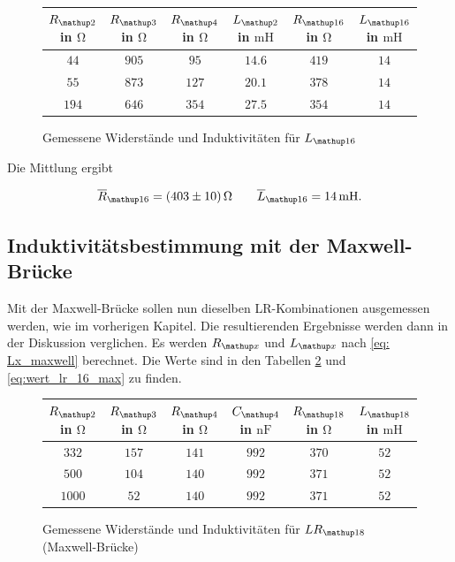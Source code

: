 \begin{figure}
\centering
\caption{Gemessene Widerstände und Induktivitäten für $L\ua{16}$}
  \label{tab:lc_r16}
\begin{tabular}{S S S S S S }
    \toprule
    {$R\ua{2}$  in $\si{\ohm}$} &  {$R\ua{3}$ in $\si{\ohm}$} & {$R\ua{4}$ in $\si{\ohm}$} & {$L\ua{2}$ in $\si{\milli\henry}$}& {$R\ua{16}$ in $\si{\ohm}$} &  {$L\ua{16}$ in $\si{\milli\henry}$} \\
    \midrule
     {$\num{44}$} & {$\num{905}$} &  {$\num{95}$}& {$\num{14,6}$}  &  {$\num{419}$} & {$\num{14}$}\\
     {$\num{55}$} & {$\num{873}$}  & {$\num{127}$} & {$\num{20,1}$} & {$\num{378}$} & {$\num{14}$}\\
     {$\num{194}$} & {$\num{646}$}  & {$\num{354}$} & {$\num{27,5}$} &{$\num{354}$} & {$\num{14}$}  \\
    \bottomrule
  \end{tabular}
 \end{figure}

Die Mittlung ergibt

\begin{equation}
\label{eq:wert_r16_l_16}
\overline{R}_{\map{16}}=\SI{403\pm10}{\ohm} \qquad \overline{L}_{\map{16}}=\SI{14}{\milli\henry}.
\end{equation}

\subsection{Induktivitätsbestimmung mit der Maxwell-Brücke}

Mit der Maxwell-Brücke sollen nun dieselben LR-Kombinationen ausgemessen werden, wie 
im vorherigen Kapitel.
Die resultierenden Ergebnisse werden dann in der Diskussion verglichen.
Es werden $R\ua{x}$ und $L\ua{x}$ nach \eqref{eq: Lx_maxwell} berechnet.
Die Werte sind in den Tabellen \ref{tab:lc_r18_max} und \ref{eq:wert_lr_16_max} zu finden.

\begin{figure}
\centering
\caption{Gemessene Widerstände und Induktivitäten für $LR\ua{18}$ (Maxwell-Brücke)}
  \label{tab:lc_r18_max}
\begin{tabular}{S S S S S S }
    \toprule
    {$R\ua{2}$  in $\si{\ohm}$} &  {$R\ua{3}$ in $\si{\ohm}$} & {$R\ua{4}$ in $\si{\ohm}$} & {$C\ua{4}$ in $\si{\nano\farad}$}& {$R\ua{18}$ in $\si{\ohm}$} &  {$L\ua{18}$ in $\si{\milli\henry}$} \\
    \midrule
     {$\num{332}$} & {$\num{157}$} &  {$\num{141}$}& {$\num{992}$}  &  {$\num{370}$} & {$\num{52}$}\\
     {$\num{500}$} & {$\num{104}$}  & {$\num{140}$} & {$\num{992}$} & {$\num{371}$} & {$\num{52}$}\\
     {$\num{1000}$} & {$\num{52}$}  & {$\num{140}$} & {$\num{992}$} &{$\num{371}$} & {$\num{52}$}  \\
    \bottomrule
  \end{tabular}
 \end{figure}


